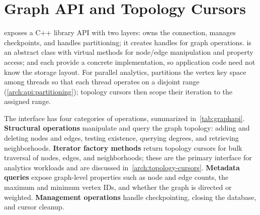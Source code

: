 \section{Graph API and Topology Cursors}
\label{arch:api}

\project{} exposes a C++ library API with two layers:  owns the \wt{} connection, manages checkpoints, and handles partitioning; it creates  handles for graph operations.
 is an abstract class with virtual methods for node/edge manipulation and property access;  and  each provide a concrete implementation, so application code need not know the storage layout.
For parallel analytics,  partitions the vertex key space among threads so that each thread operates on a disjoint range (\autoref{arch:api:partitioning}); topology cursors then scope their iteration to the assigned range.

The  interface has four categories of operations, summarized in~\autoref{tab:graphapi}.
\textbf{Structural operations} manipulate and query the graph topology: adding and deleting nodes and edges, testing existence, querying degrees, and retrieving neighborhoods.
\textbf{Iterator factory methods} return topology cursors for bulk traversal of nodes, edges, and neighborhoods; these are the primary interface for analytics workloads and are discussed in~\autoref{arch:topology-cursors}.
\textbf{Metadata queries} expose graph-level properties such as node and edge counts, the maximum and minimum vertex IDs, and whether the graph is directed or weighted.
\textbf{Management operations} handle checkpointing, closing the database, and cursor cleanup.

